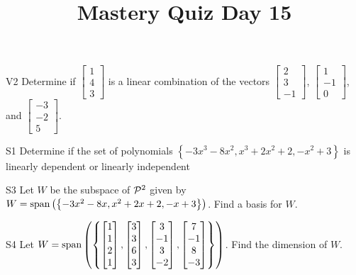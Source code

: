 \documentclass{sbgLAquiz}
\title{Mastery Quiz Day 15 }
\begin{document}
\begin{problem}{V2}
Determine if $\begin{bmatrix} 1 \\ 4 \\ 3 \end{bmatrix}$ is a linear combination of the vectors $\begin{bmatrix} 2 \\ 3 \\ -1 \end{bmatrix}$, $\begin{bmatrix} 1 \\ -1 \\ 0 \end{bmatrix}$, and $\begin{bmatrix} -3 \\ -2 \\ 5 \end{bmatrix}$.
\end{problem}

\begin{problem}{S1}
Determine if the set of polynomials $\left\{ -3x^3-8x^2, x^3+2x^2+2, -x^2+3\right\}$ is  linearly dependent or linearly independent
\end{problem}
\newpage

\begin{problem}{S3}
Let $W$ be the subspace of $\P^2$ given by $W = {\rm span} \left( \left\{  -3x^2-8x, x^2+2x+2, -x+3\right\} \right)$.   Find a basis for $W$.
\end{problem}

\begin{problem}{S4}
Let $W = {\rm span} \left( \left\{ \begin{bmatrix} 1 \\ 1 \\ 2 \\ 1 \end{bmatrix}, \begin{bmatrix} 3 \\ 3 \\ 6 \\ 3 \end{bmatrix}, \begin{bmatrix} 3 \\ -1 \\ 3 \\ -2 \end{bmatrix}, \begin{bmatrix} 7 \\ -1 \\ 8 \\ -3 \end{bmatrix} \right\} \right)$.  Find the dimension of $W$.
\end{problem}
\end{document}
